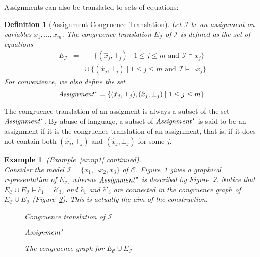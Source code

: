 \documentclass{easychair}
\newtheorem{example}{Example}
\newtheorem{definition}{Definition}
\begin{document}
Assignments can also be translated to sets of equations:
\begin{definition}[Assignment Congruence Translation]
Let $\mathcal{I}$ be an assignment on variables $x_1,\ldots,x_m$.
The congruence translation $E_{\mathcal{I}}$ of $\mathcal{I}$ is defined as the set of equations
\begin{eqnarray*}
  E_{\mathcal{I}} & = & \phantom{\cup}\ \{ (\hat{x}_j,\top_j) \mid 1 \leq j \leq m \text{ and } \mathcal{I} \models x_j \} \\
               &   & \cup\ \{ (\hat{x}_j,\bot_j) \mid 1 \leq j \leq m \text{ and } \mathcal{I} \models \neg x_j \}
\end{eqnarray*}
For convenience, we also define the set
\begin{equation*}
  {\it Assignment}^\star = \{ (\hat{x}_j,\top_j), (\hat{x}_j,\bot_j) \mid 1 \leq j \leq m\}.
\end{equation*}
\end{definition}
\noindent
The congruence translation of an assigment is always a subset of the set
${\it Assignment}^\star$.  By abuse of language, a subset of ${\it Assignment}^\star$ is
said to be an assignment if it is the congruence translation of an assignment,
that is, if it does not contain both $(\hat{x}_j,\top_j)$ and
$(\hat{x}_j,\bot_j)$ for some $j$.

\begin{example}\label{ex:np2} (Example~\ref{ex:np1} continued).\\
Consider the model $\mathcal{I} = \{x_1, \neg x_2, x_3\}$ of $\mathcal{C}$.
Figure~\ref{fig:npassignment} gives a graphical representation of
$E_{\mathcal{I}}$, whereas ${\it Assignment}^\star$ is described by
Figure~\ref{fig:npassignmentstar}.  Notice that
$E_{\mathcal{C}} \cup E_{\mathcal{I}} \models \hat{c}_1 = \hat{c}'_3$,
and $\hat{c}_1$ and $\hat{c}'_3$ are connected in the congruence graph
of $E_{\mathcal{C}} \cup E_{\mathcal{I}}$ (Figure~\ref{fig:npmodel}).
This is actually the aim of the construction.

\begin{figure}[ht]

\caption{Congruence translation of $\mathcal{I}$}
\label{fig:npassignment}
\end{figure}

\begin{figure}[ht]

\caption{${\it Assignment}^\star$}
\label{fig:npassignmentstar}
\end{figure}
\begin{figure}[ht]

\caption{The congruence graph for $E_{\mathcal{C}} \cup E_{\mathcal{I}}$}
\label{fig:npmodel}
\end{figure}
\end{example}
\end{document}
